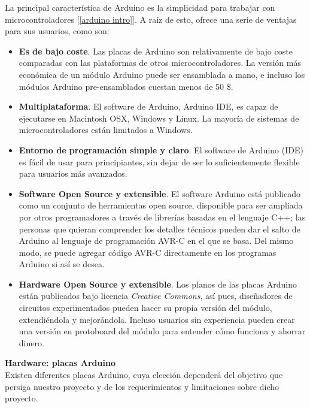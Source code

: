 \documentclass[12pt]{article}
\begin{document}
	\noindent La principal característica de Arduino es la simplicidad para trabajar con microcontroladores [\ref{arduino intro}]. A raíz de esto, ofrece una serie de ventajas para sus usuarios, como son:
	\begin{itemize}
		\item \textbf{Es de bajo coste}. Las placas de Arduino son relativamente de bajo coste comparadas con las plataformas de otros microcontroladores. La versión más económica de un módulo Arduino puede ser ensamblada a mano, e incluso los módulos Arduino pre-ensamblados cuestan menos de 50 \$.
		\item \textbf{Multiplataforma}. El software de Arduino, Arduino IDE, es capaz de ejecutarse en Macintosh OSX, Windows y Linux. La mayoría de sistemas de microcontroladores están limitados a Windows.
		\item  	\textbf{Entorno de programación simple y claro}. El software de Arduino (IDE) es fácil de usar para principiantes, sin dejar de ser lo suficientemente flexible para usuarios más avanzados.
		\item \textbf{Software Open Source y extensible}. El software Arduino está publicado como un conjunto de herramientas open source, disponible para ser ampliada por otros programadores a través de librerías basadas en el lenguaje C++; las personas que quieran comprender los detalles técnicos pueden dar el salto de Arduino al lenguaje de programación AVR-C en el que se basa. Del mismo modo, se puede agregar código AVR-C directamente en los  programas Arduino si así se desea.
		\item \textbf{Hardware Open Source y extensible}. Los planos de las placas Arduino están publicados bajo licencia \textit{Creative Commons}, así pues, diseñadores de circuitos experimentados pueden hacer su propia versión del módulo, extendiéndola y mejorándola. Incluso usuarios sin experiencia pueden crear una versión en protoboard del módulo para entender cómo funciona y ahorrar dinero.
	
	\end{itemize}

	\pagebreak

	\noindent \textbf{Hardware: placas Arduino} \\
	
	\noindent Existen diferentes placas Arduino, cuya elección dependerá del objetivo que persiga nuestro proyecto y de los requerimientos y limitaciones sobre dicho proyecto. \\
	
\end{document}
